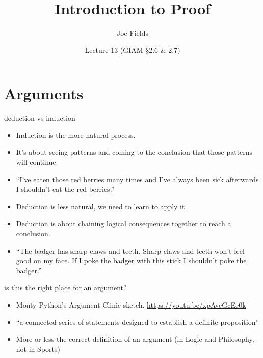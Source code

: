 \documentclass[landscape]{beamer}
\author{Joe Fields}
\title{Introduction to Proof}
\date{Lecture 13 (GIAM \S 2.6 \& 2.7)}
\institute[SCSU]{ {\tt fieldsj1@southernct.edu} }
\begin{document}
\begin{frame}[plain]
  \titlepage
\end{frame}

\section{Arguments}

\begin{frame}{deduction vs induction}
\begin{itemize}
\item Induction is the more natural process. \pause
\item It's about seeing patterns and coming to the conclusion that those patterns will continue. \pause
\item ``I've eaten those red berries many times and I've always been sick afterwards\textellipsis \pause \newline
I shouldn't eat the red berries.'' \pause
\item Deduction is less natural, we need to learn to apply it. \pause
\item Deduction is about chaining logical consequences together to reach a conclusion. \pause
\item ``The badger has sharp claws and teeth.  Sharp claws and teeth won't feel good on my face.  If I poke the badger with this stick\textellipsis \pause \newline
I shouldn't poke the badger.''
\end{itemize}
\end{frame}

\begin{frame}{is this the right place for an argument?}
\begin{itemize}
\item Monty Python's Argument Clinic sketch. \pause \href{https://youtu.be/xpAvcGcEc0k}{https://youtu.be/xpAvcGcEc0k} \pause
\item ``a connected series of statements designed to establish a definite proposition'' \pause
\item More or less the correct definition of an argument (in Logic and Philosophy, not in Sports)
\end{itemize}
\end{frame}
\end{document}
